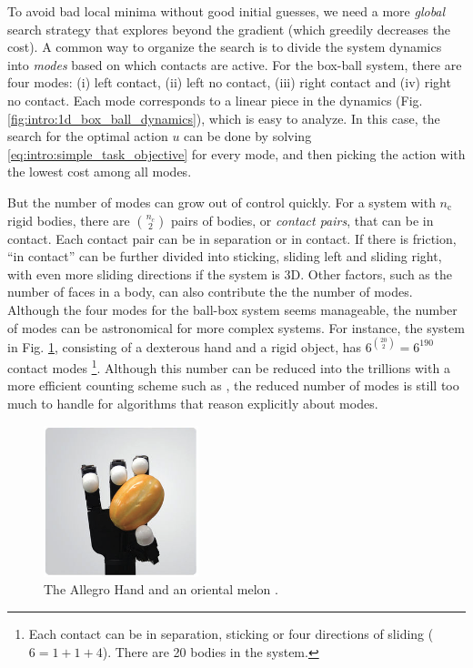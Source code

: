 To avoid bad local minima without good initial guesses, we need a more \emph{global} search strategy that explores beyond the gradient (which greedily decreases the cost). A common way to organize the search is to divide the system dynamics into \emph{modes} based on which contacts are active. For the box-ball system, there are four modes: (i) left contact, (ii) left no contact, (iii) right contact and (iv) right no contact. Each mode corresponds to a linear piece in the dynamics (Fig. \ref{fig:intro:1d_box_ball_dynamics}), which is easy to analyze. In this case, the search for the optimal action $u$ can be done by solving \eqref{eq:intro:simple_task_objective} for every mode, and then picking the action with the lowest cost among all modes.

But the number of modes can grow out of control quickly. For a system with $n_\mathrm{c}$ rigid bodies, there are $\binom{n_c}{2}$ pairs of bodies, or \emph{contact pairs}, that can be in contact. Each contact pair can be in separation or in contact. If there is friction, ``in contact'' can be further divided into sticking, sliding left and sliding right, with even more sliding directions if the system is 3D. Other factors, such as the number of faces in a body, can also contribute the the number of modes. Although the four modes for the ball-box system seems manageable, the number of modes can be astronomical for more complex systems. For instance, the system in Fig. \ref{fig:intro:allegro_hand_and_melon}, consisting of a dexterous hand and a rigid object, has $6^{\binom{20}{2}} = 6^{190}$ contact modes \footnote{Each contact can be in separation, sticking or four directions of sliding ($6 = 1 + 1 + 4$). There are 20 bodies in the system.}. Although this number can be reduced into the trillions with a more efficient counting scheme such as \cite{huang2021efficient}, the reduced number of modes is still too much to handle for algorithms that reason explicitly about modes.

\begin{figure}
\centering\includegraphics[width = 0.40\textwidth]{figures/01_intro/allegro_hand_and_melon.png}
\caption{The Allegro Hand and an oriental melon \cite{allegrohand}.}
\label{fig:intro:allegro_hand_and_melon}
\end{figure}


